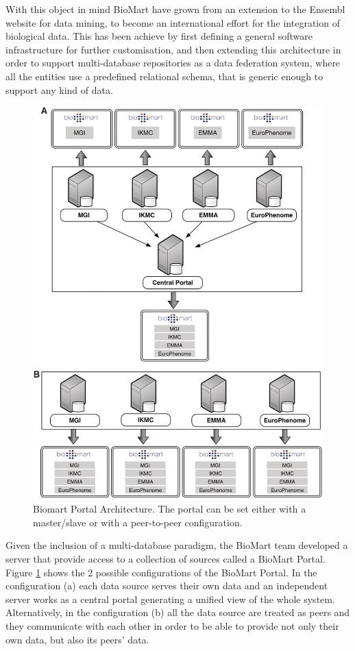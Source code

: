 With this object in mind BioMart have grown from an extension to the Ensembl website for data mining, to become an international effort for the integration of biological data. This has been achieve by first defining a general software infrastructure for further customisation, and then extending this architecture in order to support multi-database repositories as a data federation system, where all the entities use a predefined relational schema, that is generic enough to support any kind of data.

\begin{figure}  
\centering
\includegraphics[width=\textwidth]{figures/biomart.png}
\caption[Biomart Portal Architecture.]{Biomart Portal Architecture. The portal can be set either with a master/slave or with a peer-to-peer configuration.
\label{fig:biomart}}
\end{figure}

Given the inclusion of a multi-database paradigm, the BioMart team developed a server that provide access to a collection of sources called a BioMart Portal. Figure \ref{fig:biomart} shows the 2 possible configurations of the BioMart Portal. In the configuration (a) each data source serves their own data and an independent server works as a central portal generating a unified view of the whole system. Alternatively, in the configuration (b) all the data source are treated as peers and they communicate with each other in order to be able to provide not only their own data, but also its peers' data.

